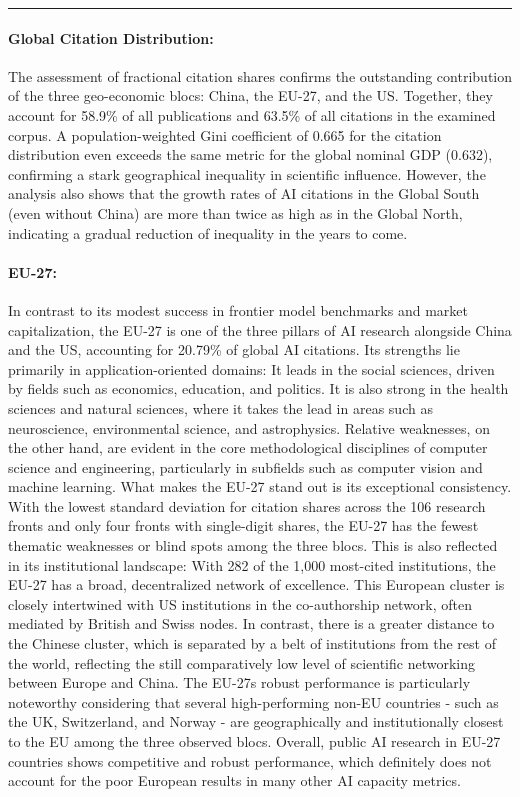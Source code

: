 \documentclass{article}
\begin{document}
	\vspace{0.25em}
	\rule{\linewidth}{0.4pt}
	\vspace{1em}
	
	\paragraph{Global Citation Distribution:} The assessment of fractional citation shares confirms the outstanding contribution of the three geo-economic blocs: China, the EU-27, and the US. Together, they account for 58.9\% of all publications and 63.5\% of all citations in the examined corpus. A population-weighted Gini coefficient of 0.665 for the citation distribution even exceeds the same metric for the global nominal GDP (0.632), confirming a stark geographical inequality in scientific influence. However, the analysis also shows that the growth rates of AI citations in the Global South (even without China) are more than twice as high as in the Global North, indicating a gradual reduction of inequality in the years to come.
	
	\paragraph{EU-27:} In contrast to its modest success in frontier model benchmarks and market capitalization, the EU-27 is one of the three pillars of AI research alongside China and the US, accounting for 20.79\% of global AI citations. Its strengths lie primarily in application-oriented domains: It leads in the social sciences, driven by fields such as economics, education, and politics. It is also strong in the health sciences and natural sciences, where it takes the lead in areas such as neuroscience, environmental science, and astrophysics. Relative weaknesses, on the other hand, are evident in the core methodological disciplines of computer science and engineering, particularly in subfields such as computer vision and machine learning. What makes the EU-27 stand out is its exceptional consistency. With the lowest standard deviation for citation shares across the 106 research fronts and only four fronts with single-digit shares, the EU-27 has the fewest thematic weaknesses or blind spots among the three blocs. This is also reflected in its institutional landscape: With 282 of the 1,000 most-cited institutions, the EU-27 has a broad, decentralized network of excellence. This European cluster is closely intertwined with US institutions in the co-authorship network, often mediated by British and Swiss nodes. In contrast, there is a greater distance to the Chinese cluster, which is separated by a belt of institutions from the rest of the world, reflecting the still comparatively low level of scientific networking between Europe and China. The EU-27s robust performance is particularly noteworthy considering that several high-performing non-EU countries - such as the UK, Switzerland, and Norway - are geographically and institutionally closest to the EU among the three observed blocs. Overall, public AI research in EU-27 countries shows competitive and robust performance, which definitely does not account for the poor European results in many other AI capacity metrics.
	
\end{document}
